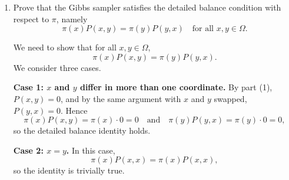 \documentclass[answers,12pt,addpoints]{exam}
\begin{document}
\begin{enumerate}
\begin{solution}
Suppose $x,y \in \Omega$ differ in exactly one coordinate, say the $i$-th one, and
satisfy $x_{-i} = y_{-i}$. Then the only way to move from $x$ to $y$ in one step
of the random-scan Gibbs sampler is:
\begin{itemize}
\item first choose $I_t = i$ in step 1, which happens with probability
$\mathbb{P}(I_t = i) = 1/d$;
\item then, in step 2, resample the $i$-th coordinate from the conditional
distribution $\pi(\,\cdot \mid x_{-i})$ and obtain the value $y_i$.
\end{itemize}
If $I_t \neq i$, the $i$-th coordinate of $X_t$ is not updated, so we cannot have
$X_{t+1} = y$ because $x_i \neq y_i$. Thus,
\[
P(x,y)
= \mathbb{P}(X_{t+1} = y \mid X_t = x)
= \mathbb{P}(I_t = i)\,
\mathbb{P}(X_{t+1} = y \mid X_t = x, I_t = i).
\]
Given $X_t = x$ and $I_t = i$, we update only the $i$-th coordinate using
$\pi(\,\cdot \mid x_{-i})$ and keep all other coordinates fixed at $x_{-i} =
y_{-i}$. Therefore,
\[
\mathbb{P}(X_{t+1} = y \mid X_t = x, I_t = i)
= \mathbb{P}(X_{t+1,i} = y_i \mid X_t = x, I_t = i)
= \pi(y_i \mid x_{-i}).
\]
Combining these two factors, we obtain
\[
P(x,y) = \frac{1}{d}\,\pi(y_i \mid x_{-i}),
\]
as claimed.
\end{solution}
\item Prove that the Gibbs sampler satisfies the detailed balance condition with respect to $\pi$, namely
\[
\pi(x) P(x,y) = \pi(y) P(y,x)
\quad \text{for all } x,y \in \Omega.
\]
\begin{solution}
We need to show that for all $x,y \in \Omega$,
\[
\pi(x) P(x,y) = \pi(y) P(y,x).
\]
We consider three cases.

\medskip
\noindent\textbf{Case 1: $x$ and $y$ differ in more than one coordinate.}
By part (1), $P(x,y) = 0$, and by the same argument with $x$ and $y$ swapped,
$P(y,x) = 0$. Hence
\[
\pi(x) P(x,y) = \pi(x)\cdot 0 = 0
\quad\text{and}\quad
\pi(y) P(y,x) = \pi(y)\cdot 0 = 0,
\]
so the detailed balance identity holds.

\medskip
\noindent\textbf{Case 2: $x = y$.}
In this case,
\[
\pi(x) P(x,x) = \pi(x) P(x,x),
\]
so the identity is trivially true.


\end{solution}
\end{enumerate}
\end{document}

